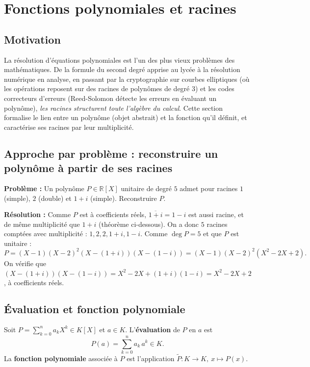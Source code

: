 \section{Fonctions polynomiales et racines}

\subsection{Motivation}
La résolution d'équations polynomiales est l'un des plus vieux problèmes des mathématiques. De la formule du second degré apprise au lycée à la résolution numérique en analyse, en passant par la cryptographie sur courbes elliptiques (où les opérations reposent sur des racines de polynômes de degré 3) et les codes correcteurs d'erreurs (Reed-Solomon détecte les erreurs en évaluant un polynôme), \emph{les racines structurent toute l'algèbre du calcul}. Cette section formalise le lien entre un polynôme (objet abstrait) et la fonction qu'il définit, et caractérise ses racines par leur multiplicité.

\subsection{Approche par problème : reconstruire un polynôme à partir de ses racines}
\textbf{Problème :} Un polynôme $P \in \mathbb{R}[X]$ unitaire de degré $5$ admet pour racines $1$ (simple), $2$ (double) et $1 + i$ (simple). Reconstruire $P$.

\textbf{Résolution :} Comme $P$ est à coefficients réels, $\overline{1 + i} = 1 - i$ est aussi racine, et de même multiplicité que $1 + i$ (théorème ci-dessous). On a donc $5$ racines comptées avec multiplicité : $1, 2, 2, 1+i, 1-i$. Comme $\deg P = 5$ et que $P$ est unitaire :
\[ P = (X - 1)(X - 2)^2 (X - (1+i))(X - (1-i)) = (X - 1)(X - 2)^2 (X^2 - 2X + 2). \]
On vérifie que $(X - (1+i))(X - (1-i)) = X^2 - 2X + (1+i)(1-i) = X^2 - 2X + 2$, à coefficients réels. \checkmark

\subsection{Évaluation et fonction polynomiale}

\begin{definition}
Soit $P = \sum_{k=0}^{n} a_k X^k \in K[X]$ et $a \in K$. L'\textbf{évaluation} de $P$ en $a$ est
\[ P(a) = \sum_{k=0}^{n} a_k\, a^k \in K. \]
La \textbf{fonction polynomiale} associée à $P$ est l'application $\widetilde{P} : K \to K,\ x \mapsto P(x)$.
\end{definition}

